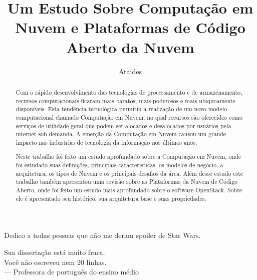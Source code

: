 \documentclass[ti]{texufpel}
\title{Um Estudo Sobre Computação em Nuvem e Plataformas de Código Aberto da Nuvem}
\author{Ataides}{Vítor Alano de}
\begin{document}
\maketitle 

\sloppy

\fichacatalografica

\begin{dedicatoria}
  Dedico a todas pessoas que não me deram spoiler de Star Wars.
\end{dedicatoria}

\begin{epigrafe}
	Sua dissertação está muito fraca. \\
	Você não escreveu nem 20 linhas. \\
  {\sc --- Professora de português do ensino médio}
\end{epigrafe}

\begin{abstract}
  Com o rápido desenvolvimento das tecnologias de processamento e de armazenamento, recursos computacionais ficaram mais baratos, mais poderosos e mais ubiquoamente disponíveis. Esta tendência tecnológica permitiu a realização de um novo modelo computacional chamado Computação em Nuvem, no qual recursos são oferecidos como serviços de utilidade geral que podem ser alocados e desalocados por usuários pela internet sob demanda. A emerção da Computação em Nuvem causou um grande impacto nas industrias de tecnologia da informação nos últimos anos.

  Neste trabalho foi feito um estudo aprofundado sobre a Computação em Nuvem, onde foi estudado suas definições, principais características, os modelos de negócio, a arquitetura, os tipos de Nuvem e os principais desafios da área. Além desse estudo este trabalho também apresentou uma revisão sobre as Plataformas da Nuvem de Código Aberto, onde foi feito um estudo mais aprofundado sobre o software OpenStack. Sobre ele é apresentado seu histórico, sua arquitetura base e suas propriedades.

\end{abstract}
\end{document}
